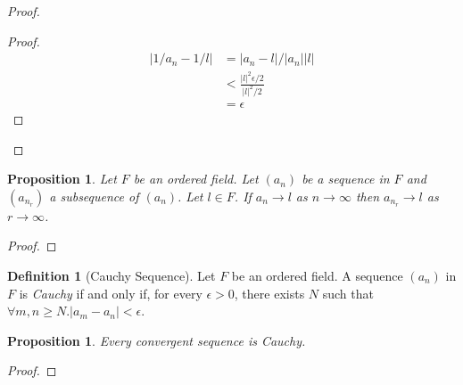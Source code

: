 \documentclass{article}
\let\qed\relax
\newtheorem{proposition}[axiom]{Proposition}
\theoremstyle{definition}
\newtheorem{definition}[axiom]{Definition}
\begin{document}
    \begin{proof}
        \pf
        \begin{proof}
            \pf
            \begin{align*}
                |1/a_n - 1/l| & = |a_n - l| / |a_n||l| \\
                & < \frac{|l|^2 \epsilon / 2}{|l|^2 / 2} \\
                & = \epsilon
            \end{align*}
        \end{proof}
        \qed
    \end{proof}

    \begin{proposition}
        Let $F$ be an ordered field. Let $(a_n)$ be a sequence in $F$ and $(a_{n_r})$ a subsequence of
        $(a_n)$. Let $l \in F$. If $a_n \rightarrow l$ as $n \rightarrow \infty$ then $a_{n_r} \rightarrow
        l$ as $r \rightarrow \infty$.
    \end{proposition}

    \begin{proof}
        \pf
        \qed
    \end{proof}
    
    \begin{definition}[Cauchy Sequence]
        Let $F$ be an ordered field. A sequence $(a_n)$ in $F$ is \emph{Cauchy} if and only if, for every
        $\epsilon > 0$, there exists $N$ such that $\forall m,n \geq N. |a_m - a_n| < \epsilon$.
    \end{definition}

    \begin{proposition}
        Every convergent sequence is Cauchy.
    \end{proposition}

    \begin{proof}
        \pf
        \qed
    \end{proof}
\end{document}
